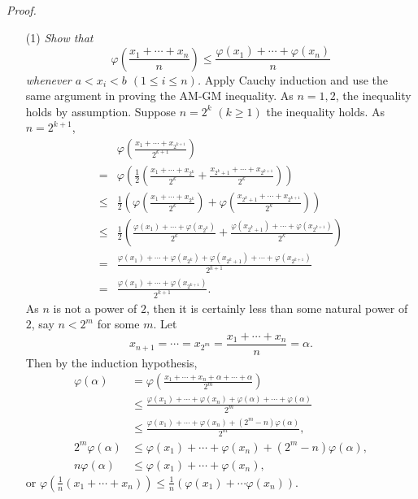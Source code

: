 \documentclass{article}
\begin{document}
\emph{Proof.}
\begin{enumerate}
\item[(1)]
  \emph{Show that
  $$\varphi\left( \frac{x_1 + \cdots + x_n}{n} \right)
  \leq \frac{\varphi(x_1) + \cdots + \varphi(x_n)}{n}$$
  whenever $a < x_i < b$ $(1 \leq i \leq n)$.}
  Apply Cauchy induction and use the same argument in proving the AM-GM inequality.
  As $n = 1, 2$, the inequality holds by assumption.
  Suppose $n = 2^k$ $(k \geq 1)$ the inequality holds.
  As $n = 2^{k+1}$,
  \begin{align*}
    &\varphi\left( \frac{x_1 + \cdots + x_{2^{k+1}}}{2^{k+1}} \right) \\
    =& \varphi\left( \frac{1}{2} \left(\frac{x_1 + \cdots + x_{2^k}}{2^k}
      + \frac{x_{2^k+1} + \cdots + x_{2^{k+1}}}{2^k}\right) \right) \\
    \leq& \frac{1}{2}
      \left(
        \varphi\left(\frac{x_1 + \cdots + x_{2^k}}{2^k} \right)
        + \varphi\left(\frac{x_{2^k+1} + \cdots + x_{2^{k+1}}}{2^k} \right)
      \right) \\
    \leq& \frac{1}{2}
      \left(
        \frac{\varphi(x_1) + \cdots + \varphi(x_{2^k})}{2^k}
        + \frac{\varphi(x_{2^k+1}) + \cdots + \varphi(x_{2^{k+1}})}{2^k}
      \right) \\
    =& \frac{\varphi(x_1) + \cdots + \varphi(x_{2^k})
      + \varphi(x_{2^k+1}) + \cdots + \varphi(x_{2^{k+1}})}{2^{k+1}} \\
    =& \frac{\varphi(x_1) + \cdots + \varphi(x_{2^{k+1}})}{2^{k+1}}.
  \end{align*}
  As $n$ is not a power of $2$,
  then it is certainly less than some natural power of $2$, say $n < 2^m$ for some $m$.
  Let
  $$x_{n+1} = \cdots = x_{2^m} = \frac{x_1 + \cdots + x_n}{n} = \alpha.$$
  Then by the induction hypothesis,
  \begin{align*}
    \varphi(\alpha)
    &= \varphi\left( \frac{x_1 + \cdots + x_n + \alpha + \cdots + \alpha}{2^m} \right) \\
    &\leq \frac{\varphi(x_1) + \cdots + \varphi(x_n) + \varphi(\alpha) + \cdots + \varphi(\alpha)}{2^m} \\
    &\leq \frac{\varphi(x_1) + \cdots + \varphi(x_n) + (2^m - n)\varphi(\alpha)}{2^m}, \\
    2^m \varphi(\alpha)
    &\leq \varphi(x_1) + \cdots + \varphi(x_n) + (2^m - n)\varphi(\alpha), \\
    n \varphi(\alpha)
    &\leq \varphi(x_1) + \cdots + \varphi(x_n),
  \end{align*}
  or $\varphi\left( \frac{1}{n} (x_1 + \cdots + x_n) \right)
  \leq \frac{1}{n}(\varphi(x_1) + \cdots \varphi(x_n))$.


\end{enumerate}
\end{document}
